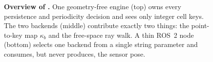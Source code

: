 \begin{figure}[t]
{}
\caption{\textbf{Overview of \sname.} One geometry-free engine (top) owns every persistence and periodicity decision and sees only integer cell keys. The two backends (middle) contribute exactly two things: the point-to-key map $\kappa_b$ and the free-space ray walk. A thin ROS~2 node (bottom) selects one backend from a single string parameter and consumes, but never produces, the sensor pose.}
\label{fig:overview}
\end{figure}

